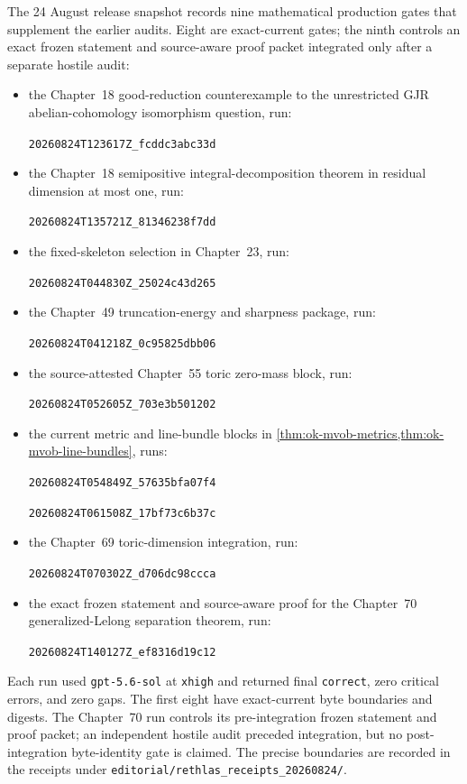 The 24 August release snapshot records nine mathematical production gates
that supplement the earlier audits.  Eight are exact-current gates; the ninth
controls an exact frozen statement and source-aware proof packet integrated
only after a separate hostile audit:
\begin{itemize}
\item the Chapter~18 good-reduction counterexample to the unrestricted GJR
  abelian-cohomology isomorphism question, run:
  \par\nolinkurl{20260824T123617Z_fcddc3abc33d}
\item the Chapter~18 semipositive integral-decomposition theorem in residual
  dimension at most one, run:
  \par\nolinkurl{20260824T135721Z_81346238f7dd}
\item the fixed-skeleton selection in Chapter~23, run:
  \par\nolinkurl{20260824T044830Z_25024c43d265}
\item the Chapter~49 truncation-energy and sharpness package, run:
  \par\nolinkurl{20260824T041218Z_0c95825dbb06}
\item the source-attested Chapter~55 toric zero-mass block, run:
  \par\nolinkurl{20260824T052605Z_703e3b501202}
\item the current metric and line-bundle blocks in
  \cref{thm:ok-mvob-metrics,thm:ok-mvob-line-bundles}, runs:
  \par\nolinkurl{20260824T054849Z_57635bfa07f4}
  \par\nolinkurl{20260824T061508Z_17bf73c6b37c}
\item the Chapter~69 toric-dimension integration, run:
  \par\nolinkurl{20260824T070302Z_d706dc98ccca}
\item the exact frozen statement and source-aware proof for the Chapter~70
  generalized-Lelong separation theorem, run:
  \par\nolinkurl{20260824T140127Z_ef8316d19c12}
\end{itemize}
Each run used \texttt{gpt-5.6-sol} at \texttt{xhigh} and returned final
\texttt{correct}, zero critical errors, and zero gaps.  The first eight have
exact-current byte boundaries and digests.  The Chapter~70 run controls its
pre-integration frozen statement and proof packet; an independent hostile
audit preceded integration, but no post-integration byte-identity gate is
claimed.  The precise boundaries are recorded in the receipts under
\nolinkurl{editorial/rethlas_receipts_20260824/}.

